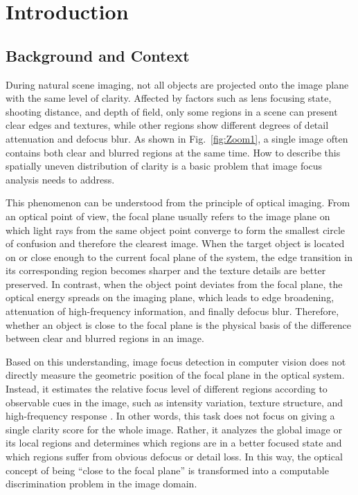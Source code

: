 \chapter{Introduction}
\section{Background and Context}

\par During natural scene imaging, not all objects are projected onto the image
plane with the same level of clarity. Affected by factors such as lens focusing
state, shooting distance, and depth of field, only some regions in a scene can
present clear edges and textures, while other regions show different degrees of
detail attenuation and defocus blur. As shown in Fig.~\ref{fig:Zoom1}, a single
image often contains both clear and blurred regions at the same time. How to
describe this spatially uneven distribution of clarity is a basic problem that
image focus analysis needs to address.

\par This phenomenon can be understood from the principle of optical imaging.
From an optical point of view, the focal plane usually refers to the image
plane on which light rays from the same object point converge to form the
smallest circle of confusion and therefore the clearest image. When the target
object is located on or close enough to the current focal plane of the system,
the edge transition in its corresponding region becomes sharper and the texture
details are better preserved. In contrast, when the object point deviates from
the focal plane, the optical energy spreads on the imaging plane, which leads
to edge broadening, attenuation of high-frequency information, and finally
defocus blur. Therefore, whether an object is close to the focal plane is the
physical basis of the difference between clear and blurred regions in an image.

\par Based on this understanding, image focus detection in computer vision does
not directly measure the geometric position of the focal plane in the optical
system. Instead, it estimates the relative focus level of different regions
according to observable cues in the image, such as intensity variation, texture
structure, and high-frequency response \cite{5739529,1284395}. In other words,
this task does not focus on giving a single clarity score for the whole image.
Rather, it analyzes the global image or its local regions and determines which
regions are in a better focused state and which regions suffer from obvious
defocus or detail loss. In this way, the optical concept of being ``close to
the focal plane'' is transformed into a computable discrimination problem in
the image domain.

